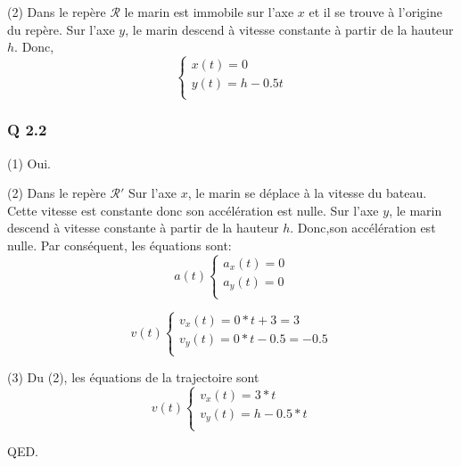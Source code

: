 \documentclass[]{book}
\theoremstyle{definition}
\begin{document}
(2) Dans le rep\`ere $\mathcal{R}$ le marin est immobile sur l'axe $x$ et il se trouve \`a l'origine du rep\`ere.
Sur l'axe $y$, le marin descend \`a vitesse constante \`a partir de la hauteur $h$. Donc, 
$$ 
\left\{ 
\begin{array}{l}
x(t) = 0 \\
y(t) = h -0.5t \\
\end{array}
\right. 
$$

\subsubsection*{Q 2.2}
(1) Oui.

(2) Dans le rep\`ere $\mathcal{R'}$ Sur l'axe $x$, le marin se d\'eplace \`a la vitesse du bateau. Cette vitesse est 
constante donc son acc\'el\'eration est nulle.
Sur l'axe $y$, le marin descend \`a vitesse constante \`a partir de la hauteur $h$. Donc,son acc\'el\'eration est nulle.  
Par cons\'equent, les \'equations sont:
$$ a(t)
\left\{ 
\begin{array}{l}
a_x(t) = 0 \\
a_y(t) = 0 \\
\end{array}
\right. 
$$

$$ v(t)
\left\{ 
\begin{array}{l}
v_x(t) = 0*t + 3 = 3 \\
v_y(t) = 0*t - 0.5 = -0.5 \\
\end{array}
\right. 
$$


(3) Du (2), les \'equations de la trajectoire sont
$$ v(t)
\left\{ 
\begin{array}{l}
v_x(t) = 3*t \\
v_y(t) = h - 0.5*t \\
\end{array}
\right. 
$$

QED.
\end{document}

